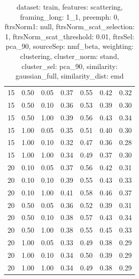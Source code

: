 \documentclass[12pt,a4paper,fleqn]{tufte-handout}
\begin{document}
\begin{table}
\begin{center}
\begin{tabular}{lllcccc}
15 & 0.50 & 0.05 & 0.37 & 0.55 & 0.42 & 0.32 \\               
15 & 0.50 & 0.10 & 0.36 & 0.53 & 0.39 & 0.30 \\               
15 & 0.50 & 1.00 & 0.39 & 0.56 & 0.43 & 0.34 \\               
15 & 1.00 & 0.05 & 0.35 & 0.51 & 0.40 & 0.30 \\               
15 & 1.00 & 0.10 & 0.32 & 0.47 & 0.36 & 0.28 \\               
15 & 1.00 & 1.00 & 0.34 & 0.49 & 0.37 & 0.30 \\               
20 & 0.10 & 0.05 & 0.37 & 0.56 & 0.42 & 0.31 \\               
20 & 0.10 & 0.10 & 0.39 & 0.55 & 0.43 & 0.33 \\               
20 & 0.10 & 1.00 & 0.41 & 0.58 & 0.46 & 0.37 \\               
20 & 0.50 & 0.05 & 0.36 & 0.52 & 0.39 & 0.31 \\               
20 & 0.50 & 0.10 & 0.38 & 0.57 & 0.43 & 0.34 \\               
20 & 0.50 & 1.00 & 0.38 & 0.55 & 0.45 & 0.33 \\               
20 & 1.00 & 0.05 & 0.33 & 0.49 & 0.38 & 0.29 \\               
20 & 1.00 & 0.10 & 0.34 & 0.50 & 0.39 & 0.29 \\               
20 & 1.00 & 1.00 & 0.34 & 0.49 & 0.38 & 0.29 \\               
\end{tabular}               
\end{center}               
\caption{dataset: train, features: scattering, framing\_long: 1\_1, preemph: 0, ftrsNorm1: null, ftrsNorm\_scat\_selection: 1, ftrsNorm\_scat\_threshold: 0.01, ftrsSel: pca\_90, sourceSep: nmf\_beta, weighting: clustering, cluster\_norm: stand, cluster\_sel: pca\_90, similarity: gaussian\_full, similarity\_dist: emd}               
\label{datasetrFeaturscFraminlong1_1Preemp0Ftrsnorm1nuFtrsnoscatselect1Ftrsnoscatthresh0.01Ftrsselpc90SourcesepnmbeWeightclClustenormstClusteselpc90SimilagafuSimiladistem}               
\end{table}               
 
\end{document}
